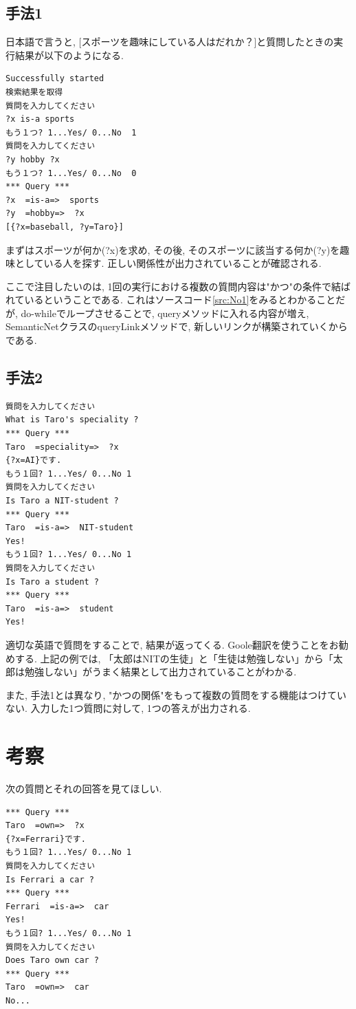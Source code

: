 \documentclass[uplatex,12pt]{jsarticle}
\begin{document}
\subsection{手法1}
日本語で言うと, [スポーツを趣味にしている人はだれか？]と質問したときの実行結果が以下のようになる.
\begin{lstlisting}
Successfully started
検索結果を取得
質問を入力してください
?x is-a sports
もう１つ? 1...Yes/ 0...No  1
質問を入力してください
?y hobby ?x
もう１つ? 1...Yes/ 0...No  0
*** Query ***
?x  =is-a=>  sports
?y  =hobby=>  ?x
[{?x=baseball, ?y=Taro}]
\end{lstlisting}

まずはスポーツが何か(?x)を求め, その後, そのスポーツに該当する何か(?y)を趣味としている人を探す. 正しい関係性が出力されていることが確認される.

ここで注目したいのは, 1回の実行における複数の質問内容は"かつ"の条件で結ばれているということである. これはソースコード\ref{src:No1}をみるとわかることだが, do-whileでループさせることで, queryメソッドに入れる内容が増え, SemanticNetクラスのqueryLinkメソッドで, 新しいリンクが構築されていくからである.

\subsection{手法2}
\begin{lstlisting}
質問を入力してください
What is Taro's speciality ?
*** Query ***
Taro  =speciality=>  ?x
{?x=AI}です.
もう１回? 1...Yes/ 0...No 1
質問を入力してください
Is Taro a NIT-student ?
*** Query ***
Taro  =is-a=>  NIT-student
Yes!
もう１回? 1...Yes/ 0...No 1
質問を入力してください
Is Taro a student ?
*** Query ***
Taro  =is-a=>  student
Yes!
\end{lstlisting}

適切な英語で質問をすることで, 結果が返ってくる. Goole翻訳を使うことをお勧めする. 上記の例では, 「太郎はNITの生徒」と「生徒は勉強しない」から「太郎は勉強しない」がうまく結果として出力されていることがわかる.

また, 手法1とは異なり, "かつの関係"をもって複数の質問をする機能はつけていない. 入力した1つ質問に対して, 1つの答えが出力される. 

\section{考察}
次の質問とそれの回答を見てほしい.
\begin{lstlisting}
*** Query ***
Taro  =own=>  ?x
{?x=Ferrari}です.
もう１回? 1...Yes/ 0...No 1
質問を入力してください
Is Ferrari a car ?
*** Query ***
Ferrari  =is-a=>  car
Yes!
もう１回? 1...Yes/ 0...No 1
質問を入力してください
Does Taro own car ?
*** Query ***
Taro  =own=>  car
No...
\end{lstlisting}
\end{document}
